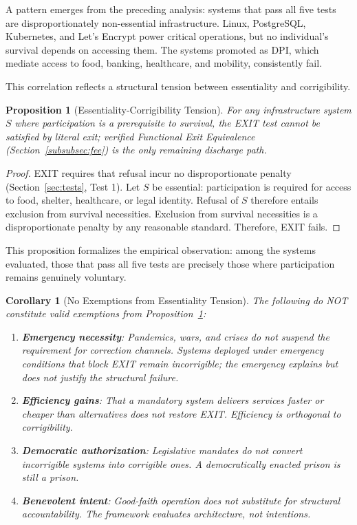 \documentclass{article}
\newtheorem{proposition}{Proposition}[section]
\newtheorem{corollary}{Corollary}[section]
\begin{document}
A pattern emerges from the preceding analysis: systems that pass all five tests are disproportionately non-essential infrastructure. Linux, PostgreSQL, Kubernetes, and Let's Encrypt power critical operations, but no individual's survival depends on accessing them. The systems promoted as DPI, which mediate access to food, banking, healthcare, and mobility, consistently fail.

This correlation reflects a structural tension between essentiality and corrigibility.

\begin{proposition}[Essentiality-Corrigibility Tension]
\label{prop:essentiality}
For any infrastructure system $S$ where participation is a prerequisite to survival, the EXIT test cannot be satisfied by literal exit; verified Functional Exit Equivalence (Section~\ref{subsubsec:fee}) is the only remaining discharge path.
\end{proposition}

\begin{proof}
EXIT requires that refusal incur no disproportionate penalty (Section~\ref{sec:tests}, Test 1). Let $S$ be essential: participation is required for access to food, shelter, healthcare, or legal identity. Refusal of $S$ therefore entails exclusion from survival necessities. Exclusion from survival necessities is a disproportionate penalty by any reasonable standard. Therefore, EXIT fails.
\end{proof}

This proposition formalizes the empirical observation: among the systems evaluated, those that pass all five tests are precisely those where participation remains genuinely voluntary.

\begin{corollary}[No Exemptions from Essentiality Tension]
\label{cor:no-exemptions}
The following do NOT constitute valid exemptions from Proposition~\ref{prop:essentiality}:
\begin{enumerate}[noitemsep]
    \item \textbf{Emergency necessity}: Pandemics, wars, and crises do not suspend the requirement for correction channels. Systems deployed under emergency conditions that block EXIT remain incorrigible; the emergency explains but does not justify the structural failure.
    \item \textbf{Efficiency gains}: That a mandatory system delivers services faster or cheaper than alternatives does not restore EXIT. Efficiency is orthogonal to corrigibility.
    \item \textbf{Democratic authorization}: Legislative mandates do not convert incorrigible systems into corrigible ones. A democratically enacted prison is still a prison.
    \item \textbf{Benevolent intent}: Good-faith operation does not substitute for structural accountability. The framework evaluates architecture, not intentions.
\end{enumerate}
\end{corollary}
\end{document}
